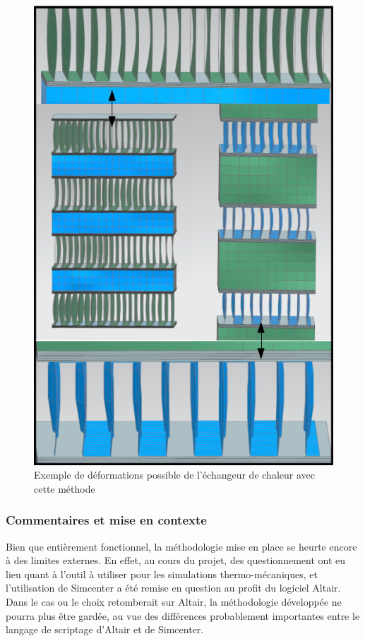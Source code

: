 \documentclass[a4paper,10pt]{article}
\begin{document}
\begin{figure}[H]
   \centering   
   \includegraphics[scale=0.5]{./exchangerPics/exchangerDeformations.png}
      \caption{Exemple de déformations possible de l'échangeur de chaleur avec cette méthode}
         \label{deformationsExchanger}
\end{figure}

\subsubsection{Commentaires et mise en contexte}

Bien que entièrement fonctionnel, la méthodologie mise en place se heurte encore à des limites externes. En effet, au cours du projet, des questionnement ont eu lieu quant à l'outil à utiliser pour les simulations thermo-mécaniques, et l'utilisation de Simcenter a été remise en question au profit du logiciel Altair.\\ 
Dans le cas ou le choix retomberait sur Altair, la méthodologie développée ne pourra plus être gardée, au vue des différences probablement importantes entre le langage de scriptage d'Altair et de Simcenter.\\ 
 
\end{document}
